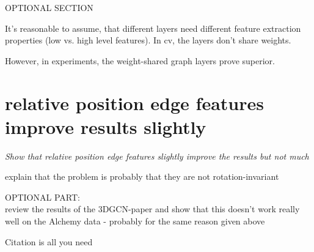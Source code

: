 {\itshape
	
OPTIONAL SECTION

It's reasonable to assume, that different layers need different feature extraction properties (low vs. high level features). In cv, the layers don't share weights.

However, in experiments, the weight-shared graph layers prove superior.
}

\section{relative position edge features improve results slightly}

{\itshape
 Show that relative position edge features slightly improve the results but not much
 
 explain that the problem is probably that they are not rotation-invariant
	
	
OPTIONAL PART:\\
review the results of the 3DGCN-paper and show that this doesn't work really well on the Alchemy data - probably for the same reason given above
}

Citation is all you need~\cite{Vaswani2017}

